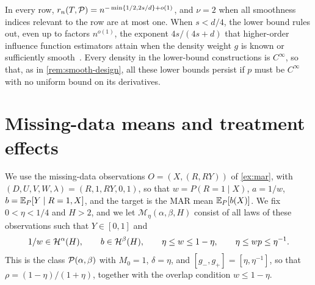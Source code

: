 In every row, $r_n(T,\mathcal P)=n^{-\min\{1/2,2s/d\}+o(1)}$, and $\nu=2$
when all smoothness indices relevant to the row are at most one. When
$s<d/4$, the lower bound rules out, even up to factors $n^{o(1)}$, the
exponent $4s/(4s+d)$ that higher-order influence function estimators
attain when the density weight $g$ is known or sufficiently
smooth~\cite[Section~3.1 and Corollary~9.1]{robins}. Every density in the
lower-bound constructions is $C^\infty$, so that, as in
\cref{rem:smooth-design}, all these lower bounds persist if $p$
must be $C^\infty$ with no uniform bound on its derivatives.

\section{Missing-data means and treatment effects}\label{sec:mar-implications}

We use the missing-data observations $O=(X,(R,RY))$ of
\cref{ex:mar}, with $(D,U,V,W,\lambda)=(R,1,RY,0,1)$, so that
$w=P(R=1\mid X)$, $a=1/w$, $b=\mathbb E_P[Y\mid R=1,X]$, and the target is the
MAR mean $\mathbb E_P[b(X)]$. We fix $0<\eta<1/4$ and $H>2$, and we let
$\mathcal M_\eta(\alpha,\beta,H)$ consist of all laws of these
observations such that $Y\in[0,1]$ and
\[
 1/w\in\mathcal H^\alpha(H),\qquad b\in\mathcal H^\beta(H),\qquad
 \eta\le w\le1-\eta,\qquad \eta\le wp\le\eta^{-1}.
\]
This is the class $\mathcal P(\alpha,\beta)$ with $M_0=1$, $\delta=\eta$, and
$[g_-,g_+]=[\eta,\eta^{-1}]$, so that $\rho=(1-\eta)/(1+\eta)$,
together with the overlap condition $w\le1-\eta$.


